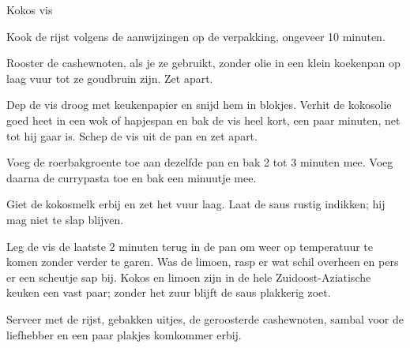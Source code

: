 \begin{recipe}{Kokos vis}
\begin{steps}
  \item Kook de rijst volgens de aanwijzingen op de verpakking, ongeveer
        10 minuten.
  \item Rooster de cashewnoten, als je ze gebruikt, zonder olie in een
        klein koekenpan op laag vuur tot ze goudbruin zijn. Zet apart.
  \item Dep de vis droog met keukenpapier en snijd hem in blokjes. Verhit de kokosolie goed heet in een wok of hapjespan en bak de vis
        heel kort, een paar minuten, net tot hij gaar is. Schep de vis uit de pan
        en zet apart.
  \item Voeg de roerbakgroente toe aan dezelfde pan en bak 2 tot 3 minuten mee. Voeg daarna de currypasta toe en bak een minuutje mee.
  \item Giet de kokosmelk erbij en zet het vuur laag. Laat de saus rustig
        indikken; hij mag niet te slap blijven.
  \item Leg de vis de laatste 2 minuten terug in de pan om weer op temperatuur
        te komen zonder verder te garen. Was de limoen, rasp er wat schil overheen en pers
        er een scheutje sap bij. Kokos en limoen zijn in de hele
        Zuidoost-Aziatische keuken een vast paar; zonder het zuur blijft de saus
        plakkerig zoet.
  \item Serveer met de rijst, gebakken uitjes, de geroosterde cashewnoten,
        sambal voor de liefhebber en een paar plakjes komkommer erbij.
\end{steps}

\end{recipe}
